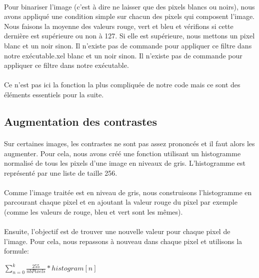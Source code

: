 \documentclass{article}
\begin{document}
\paragraph{}Pour binariser l'image (c'est à dire ne laisser que des pixels blancs ou noirs), nous avons appliqué une condition simple sur chacun des pixels qui composent l'image. Nous faisons la moyenne des valeurs rouge, vert et bleu et vérifions si cette dernière est supérieure ou non à 127. Si elle est supérieure, nous mettons un pixel blanc et un noir sinon. Il n'existe pas de commande pour appliquer ce filtre dans notre exécutable.xel blanc et un noir sinon. Il n'existe pas de commande pour appliquer ce filtre dans notre exécutable.
\paragraph{} Ce n'est pas ici la fonction la plus compliquée de notre code mais ce sont des éléments essentiels pour la suite.

\newpage

\subsection{Augmentation des contrastes}

\paragraph{}Sur certaines images, les contrastes ne sont pas assez prononcés et il faut alors les augmenter. Pour cela, nous avons créé une fonction utilisant un histogramme normalisé de tous les pixels d'une image en niveaux de gris. L'histogramme est représenté par une liste de taille 256.

\paragraph{}Comme l'image traitée est en niveau de gris, nous construisons l'histogramme en parcourant chaque pixel et en ajoutant la valeur rouge du pixel par exemple (comme les valeurs de rouge, bleu et vert sont les mêmes).

\paragraph{}Ensuite, l'objectif est de trouver une nouvelle valeur pour chaque pixel de l'image. Pour cela, nous repassons à nouveau dans chaque pixel et utilisons la formule:\newline
\begin{center}
	$\sum_{n=0}^{k}\frac{255}{nbPixels}*histogram[n]$
\end{center}
\end{document}
